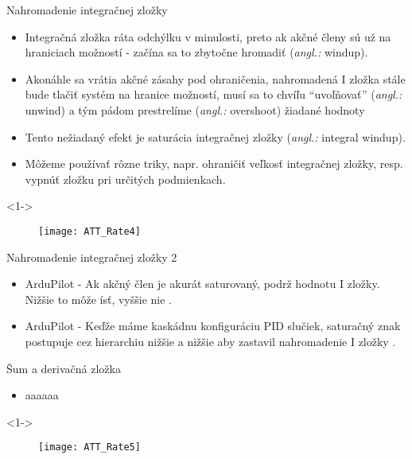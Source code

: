 \documentclass{beamer}
\newcommand{\angl}[1]{{\color{gray}(\emph{angl.:} #1)}}
\begin{document}
\begin{frame}[t]{Nahromadenie integračnej zložky}
  \begin{itemize}
    \item<1-> Integračná zložka ráta odchýlku v minulosti, preto ak akčné členy sú už na hraniciach možností - začína sa to zbytočne hromadiť \angl{windup}.
    \item<2-> Akonáhle sa vrátia akčné zásahy pod ohraničenia, nahromadená I zložka stále bude tlačiť systém na hranice možností, musí sa to chvíľu ``uvoľňovať'' \angl{unwind} a tým pádom prestrelíme \angl{overshoot} žiadané hodnoty
    \item<3-> Tento nežiadaný efekt je saturácia integračnej zložky \angl{integral windup}.
    \item<4-> Môžeme používať rôzne triky, napr. ohraničiť veľkosť integračnej zložky, resp. vypnúť zložku pri určitých podmienkach.
  \end{itemize}
      \begin{onlyenv}<1->
  \begin{figure}
\centering
  \texttt{[image: ATT\_Rate4]}\\
\end{figure}
\end{onlyenv}

\end{frame}

\begin{frame}[t]{Nahromadenie integračnej zložky 2}
  \begin{itemize}
  \item<1-> ArduPilot - Ak akčný člen je akurát saturovaný, podrž hodnotu I zložky. Nižšie to môže ísť, vyššie nie \citep{AP:PID}.
  \item<2-> ArduPilot - Keďže máme kaskádnu konfiguráciu PID slučiek, saturačný znak postupuje cez hierarchiu nižšie a nižšie aby zastavil nahromadenie I zložky \citep{AP:PID}.
  \end{itemize}
\end{frame}

\begin{frame}[t]{Šum a derivačná zložka}
  \begin{itemize}
    \item<1-> aaaaaa
  \end{itemize}
      \begin{onlyenv}<1->
  \begin{figure}
\centering
  \texttt{[image: ATT\_Rate5]}\\
\end{figure}
\end{onlyenv}

\end{frame}
\end{document}
